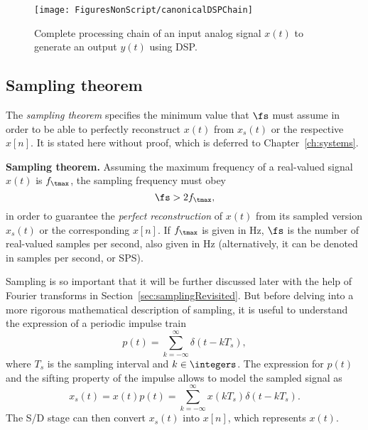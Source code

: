 \begin{figure}
	\centering
		\texttt{[image: FiguresNonScript/canonicalDSPChain]}
	\caption{Complete processing chain of an input analog signal $x(t)$
to generate an output $y(t)$ using DSP.\label{fig:canonicalDSPChain}}
\end{figure}



\subsection{Sampling theorem}
\label{sec:sampling_theorem}

The \emph{sampling theorem } specifies the minimum value that $\fs$ must assume in order to be able to perfectly reconstruct $x(t)$ from $x_s(t)$ or the respective $x[n]$. It is stated here without proof, which is deferred to Chapter~\ref{ch:systems}.

\bTheorem
\label{th:sampling} \textbf{Sampling theorem.}
Assuming the maximum frequency of a real-valued signal $x(t)$ is $f_\tmax$, the sampling frequency must obey 
\begin{equation}
\label{eq:samplingTheoremRealSignals}
\fs > 2 f_\tmax,	
\end{equation}
in order to guarantee the \emph{perfect reconstruction} of $x(t)$ from its sampled version $x_s(t)$ or the corresponding $x[n]$.
If $f_\tmax$ is given in Hz, $\fs$ is the number of real-valued samples per second, also given in Hz (alternatively, it can be denoted in samples per second, or SPS).
\eTheorem

Sampling is so important that it will be further discussed later with the help of Fourier transforms in Section~\ref{sec:samplingRevisited}. But before delving into a more rigorous mathematical description of sampling, it is useful to understand the expression of a periodic impulse train
\[
p(t) = \sum_{k=-\infty}^\infty \delta(t-k T_s),
\]
where $T_s$ is the sampling interval and $k \in \integers$. The expression for $p(t)$ and the sifting property of the impulse allows to model the sampled signal as
\begin{equation}
x_s(t) = x(t) p(t) = \sum_{k=-\infty}^\infty x(k T_s) \delta(t-k T_s).
\label{eq:sampledSignalGeneral}
\end{equation}
The S/D stage can then convert $x_s(t)$ into $x[n]$, which represents $x(t)$.

